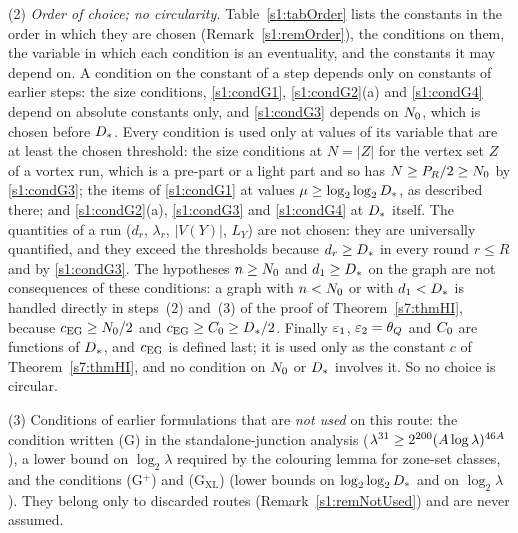 \begin{condition}
(2) \emph{Order of choice; no circularity.} Table~\ref{s1:tabOrder} lists the
constants in the order in which they are chosen (Remark~\ref{s1:remOrder}), the
conditions on them, the variable in which each condition is an eventuality, and
the constants it may depend on. A condition on the constant of a step depends
only on constants of earlier steps: the size conditions, \ref{s1:condG1},
\ref{s1:condG2}(a) and \ref{s1:condG4} depend on absolute constants only, and
\ref{s1:condG3} depends on $N_{0}$, which is chosen before $D_{*}$. Every
condition is used only at values of its variable that are at least the chosen
threshold: the size conditions at $N=|Z|$ for the vertex set $Z$ of a vortex
run, which is a pre-part or a light part and so has $N\ge P_R/2\ge N_{0}$ by
\ref{s1:condG3}; the items of \ref{s1:condG1} at values
$\mu\ge\log_2\log_2D_{*}$, as described there; and \ref{s1:condG2}(a),
\ref{s1:condG3} and \ref{s1:condG4} at $D_{*}$ itself. The quantities of a
run ($d_r$, $\lambda_r$, $|V(Y)|$, $L_Y$) are not chosen: they are universally
quantified, and they exceed the thresholds because $d_r\ge D_{*}$ in every round
$r\le R$ and by \ref{s1:condG3}. The hypotheses $n\ge N_{0}$ and
$d_1\ge D_{*}$ on the graph are not consequences of these conditions: a graph
with $n<N_{0}$ or with $d_1<D_{*}$ is handled directly in steps~(2) and~(3) of
the proof of Theorem~\ref{s7:thmHI}, because $c_{\mathrm{EG}}\ge N_{0}/2$ and
$c_{\mathrm{EG}}\ge C_{0}\ge D_{*}/2$. Finally
$\varepsilon_{1}$, $\varepsilon_{2}=\theta_{Q}$ and $C_{0}$ are functions of $D_{*}$, and $c_{\mathrm{EG}}$
is defined last; it is used only as the constant $c$ of
Theorem~\ref{s7:thmHI}, and no condition on $N_{0}$ or $D_{*}$ involves it.
So no choice is circular.

(3) Conditions of earlier formulations that are \emph{not used} on this route:
the condition written (G) in the standalone-junction analysis
($\lambda^{31}\ge2^{200}(A\log\lambda)^{46A}$), a lower bound on
$\log_2\lambda$ required by the colouring lemma for zone-set classes, and the
conditions (G$^+$) and (G$_{\mathrm{XL}}$) (lower bounds on
$\log_2\log_2D_{*}$ and on $\log_2\lambda$). They belong only to discarded
routes (Remark~\ref{s1:remNotUsed}) and are never assumed.
\end{condition}

